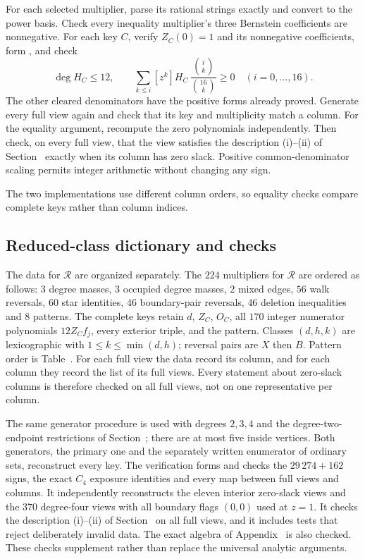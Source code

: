 \documentclass[11pt]{article}
\begin{document}
For each selected multiplier, parse its rational strings exactly and convert  to the power basis. Check every inequality multiplier's three Bernstein coefficients are nonnegative. For each key $C$, verify $Z_C(0)=1$ and its nonnegative coefficients, form , and check
\[
 \deg H_C\le12,\qquad
 \sum_{k\le i}[z^k]H_C\,\frac{\binom{i}{k}}{\binom{16}{k}}\ge0
 \quad(i=0,\ldots,16).
\]
The other cleared denominators have the positive forms already proved. Generate every full view again and check that its key and multiplicity match a column. For the equality argument, recompute the zero polynomials independently. Then check, on every full view, that the view satisfies the description (i)--(ii) of Section~ exactly when its column has zero slack. Positive common-denominator scaling permits integer arithmetic without changing any sign.

The two implementations use different column orders, so equality checks compare complete keys rather than column indices.

\subsection{Reduced-class dictionary and checks}
The data for $\mathcal R$ are organized separately. The $224$ multipliers for $\mathcal R$ are ordered as follows: $3$ degree masses, $3$ occupied degree masses, $2$ mixed edges, $56$ walk reversals, $60$ star identities, $46$ boundary-pair reversals, $46$ deletion inequalities and $8$ patterns. The complete keys retain $d$, $Z_C$, $O_C$, all $170$ integer numerator polynomials $12Z_Cf_j$, every exterior triple, and the pattern. Classes $(d,h,k)$ are lexicographic with $1\le k\le\min(d,h)$; reversal pairs are $X$ then $B$. Pattern order is Table~. For each full view the data record its column, and for each column they record the list of its full views. Every statement about zero-slack columns is therefore checked on all full views, not on one representative per column.

The same generator procedure is used with degrees $2,3,4$ and the degree-two-endpoint restrictions of Section~; there are at most five inside vertices. Both generators, the primary one and the separately written enumerator of ordinary sets, reconstruct every key. The verification forms  and checks the $29\,274+162$ signs, the exact $C_4$ exposure identities and every map between full views and columns. It independently reconstructs the eleven interior zero-slack views and the $370$ degree-four views with all boundary flags $(0,0)$ used at $z=1$. It checks the description (i)--(ii) of Section~ on all full views, and it includes tests that reject deliberately invalid data. The exact algebra of Appendix~ is also checked. These checks supplement rather than replace the universal analytic arguments.
\end{document}
